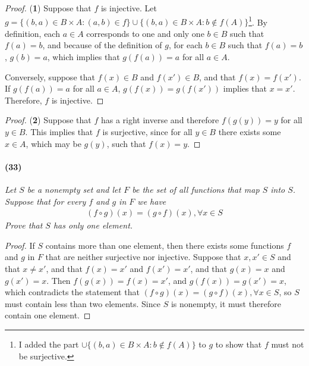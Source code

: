 \begin{proof}(\textbf{1})
	Suppose that $f$ is injective. Let $g = \{(b,a)\in B\times A:(a,b)\in f\}\cup\{(b,a)\in B\times A:b\notin f(A)\}$\footnote{I added the part $\cup\{(b,a)\in B\times A:b\notin f(A)\}$ to $g$ to show that $f$ must not be surjective.}. By definition, each $a\in A$ corresponds to one and only one $b\in B$ such that $f(a)=b$, and because of the definition of $g$, for each $b\in B$ such that $f(a)=b$, $g(b)=a$, which implies that $g(f(a))=a$ for all $a\in A$. 
	
	Conversely, suppose that $f(x)\in B$ and $f(x')\in B$, and that $f(x)=f(x')$. If $g(f(a))=a$ for all $a\in A$, $g(f(x))=g(f(x'))$ implies that $x=x'$. Therefore, $f$ is injective.
\end{proof}

\begin{proof}(\textbf{2})
	Suppose that $f$ has a right inverse and therefore $f(g(y))=y$ for all $y\in B$. This implies that $f$ is surjective, since for all $y\in B$ there exists some $x\in A$, which may be $g(y)$, such that $f(x)=y$.
\end{proof}

\newpage
\paragraph{(33)}

\textit{Let $S$ be a nonempty set and let $F$ be the set of all functions that map $S$ into $S$. Suppose that for every $f$ and $g$ in $F$ we have
\begin{align*}
	(f\circ g)(x)=(g\circ f)(x), \forall x\in S
\end{align*}
Prove that $S$ has only one element.}

\begin{proof}
	If $S$ contains more than one element, then there exists some functions $f$ and $g$ in $F$ that are neither surjective nor injective. Suppose that $x,x'\in S$ and that $x\neq x'$, and that $f(x)=x'$ and $f(x')=x'$, and that $g(x)=x$ and $g(x')=x$. Then $f(g(x))=f(x)=x'$, and $g(f(x))=g(x')=x$, which contradicts the statement that $(f\circ g)(x)=(g\circ f)(x), \forall x\in S$, so $S$ must contain less than two elements. Since $S$ is nonempty, it must therefore contain one element.
\end{proof}
 



























